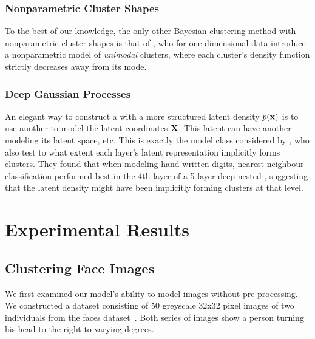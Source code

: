 
\subsubsection{Nonparametric Cluster Shapes}

To the best of our knowledge, the only other Bayesian clustering method with nonparametric cluster shapes is that of \citet{rodriguez2012univariate}, who for one-dimensional data introduce a nonparametric model of \emph{unimodal} clusters, where each cluster's density function strictly decreases away from its mode.


\subsubsection{Deep Gaussian Processes}

An elegant way to construct a \gplvm{} with a more structured latent density $p({\bf{x}})$ is to use another \gplvm{} to model the latent coordinates $\mathbf{X}$.
This latent \gplvm{} can have another \gplvm{} modeling its latent space, etc.
This is exactly the model class considered by \citet{damianou2012deep}, who also test to what extent each layer's latent representation implicitly forms clusters.
They found that when modeling \MNIST{} hand-written digits, nearest-neighbour classification performed best in the 4th layer of a 5-layer deep nested \gplvm{}, suggesting that the latent density might have  been implicitly forming clusters at that level.


\section{Experimental Results}
\label{sec:iwmm-experiments}

\subsection{Clustering Face Images}

We first examined our model's ability to model images without pre-processing.
We constructed a dataset consisting of 50 greyscale 32x32 pixel images of two individuals from the \UMIST{} faces dataset~\citep{umistfaces}.
Both series of images show a person turning his head to the right to varying degrees.

